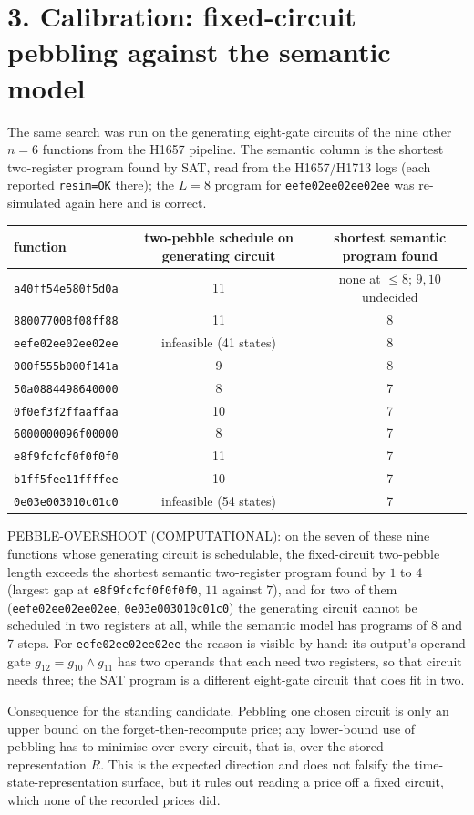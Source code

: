 \documentclass[11pt]{article}
\begin{document}
\section*{3. Calibration: fixed-circuit pebbling against the semantic model}
The same search was run on the generating eight-gate circuits of the nine other $n=6$ functions from the H1657 pipeline. The semantic column is the shortest two-register program found by SAT, read from the H1657/H1713 logs (each reported \texttt{resim=OK} there); the $L=8$ program for \texttt{eefe02ee02ee02ee} was re-simulated again here and is correct.
\begin{center}\small
\begin{tabular}{lcc}
function & two-pebble schedule on generating circuit & shortest semantic program found\\\hline
\texttt{a40ff54e580f5d0a} & 11 & none at $\le 8$; $9,10$ undecided\\
\texttt{880077008f08ff88} & 11 & 8\\
\texttt{eefe02ee02ee02ee} & infeasible (41 states) & 8\\
\texttt{000f555b000f141a} & 9 & 8\\
\texttt{50a0884498640000} & 8 & 7\\
\texttt{0f0ef3f2ffaaffaa} & 10 & 7\\
\texttt{6000000096f00000} & 8 & 7\\
\texttt{e8f9fcfcf0f0f0f0} & 11 & 7\\
\texttt{b1ff5fee11ffffee} & 10 & 7\\
\texttt{0e03e003010c01c0} & infeasible (54 states) & 7\\
\end{tabular}
\end{center}
PEBBLE-OVERSHOOT (COMPUTATIONAL): on the seven of these nine functions whose generating circuit is schedulable, the fixed-circuit two-pebble length exceeds the shortest semantic two-register program found by $1$ to $4$ (largest gap at \texttt{e8f9fcfcf0f0f0f0}, $11$ against $7$), and for two of them (\texttt{eefe02ee02ee02ee}, \texttt{0e03e003010c01c0}) the generating circuit cannot be scheduled in two registers at all, while the semantic model has programs of 8 and 7 steps. For \texttt{eefe02ee02ee02ee} the reason is visible by hand: its output's operand gate $g_{12}=g_{10}\wedge g_{11}$ has two operands that each need two registers, so that circuit needs three; the SAT program is a different eight-gate circuit that does fit in two.

Consequence for the standing candidate. Pebbling one chosen circuit is only an upper bound on the forget-then-recompute price; any lower-bound use of pebbling has to minimise over every circuit, that is, over the stored representation $R$. This is the expected direction and does not falsify the time-state-representation surface, but it rules out reading a price off a fixed circuit, which none of the recorded prices did.
\end{document}
